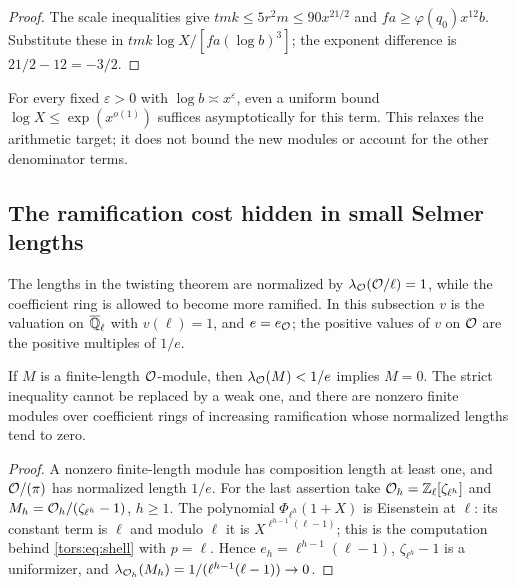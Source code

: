 \begin{proof}
The scale inequalities give $tmk\le5r^2m\le90x^{21/2}$ and
$fa\ge\varphi(q_0)x^{12}b$. Substitute these in
$tmk\log X/[fa(\log b)^3]$; the exponent difference is $21/2-12=-3/2$.
\end{proof}

For every fixed $\varepsilon>0$ with $\log b\asymp x^\varepsilon$, even a
uniform bound $\log X\le\exp(x^{o(1)})$ suffices asymptotically for this
term. This relaxes the arithmetic target; it does not bound the new
modules or account for the other denominator terms.

\subsection{The ramification cost hidden in small Selmer lengths}\label{sel:sec:ramification}

The lengths in the twisting theorem are normalized by
$\lambda_{\mathcal{O}}(\mathcal{O}/\ell)=1$, while the coefficient ring is allowed to become
more ramified. In this subsection $v$ is the valuation on
$\overline{\mathbb{Q}}_\ell$ with $v(\ell)=1$, and $e=e_{\mathcal{O}}$; the positive values
of $v$ on $\mathcal{O}$ are the positive multiples of $1/e$.

\begin{proposition}\label{sel:prop:threshold}
If $M$ is a finite-length $\mathcal{O}$-module, then
$\lambda_{\mathcal{O}}(M)<1/e$ implies $M=0$. The strict inequality cannot be
replaced by a weak one, and there are nonzero finite modules over
coefficient rings of increasing ramification whose normalized lengths tend
to zero.
\end{proposition}

\begin{proof}
A nonzero finite-length module has composition length at least one, and
$\mathcal{O}/(\pi)$ has normalized length $1/e$. For the last assertion take
$\mathcal{O}_h=\mathbb{Z}_\ell[\zeta_{\ell^h}]$ and $M_h=\mathcal{O}_h/(\zeta_{\ell^h}-1)$,
$h\ge1$. The polynomial $\Phi_{\ell^h}(1+X)$ is Eisenstein at $\ell$: its
constant term is $\ell$ and modulo $\ell$ it is $X^{\ell^{h-1}(\ell-1)}$; this
is the computation behind \eqref{tors:eq:shell} with $p=\ell$. Hence
$e_h=\ell^{h-1}(\ell-1)$,
$\zeta_{\ell^h}-1$ is a uniformizer, and
$\lambda_{\mathcal{O}_h}(M_h)=1/(\ell^{h-1}(\ell-1))\to0$.
\end{proof}

